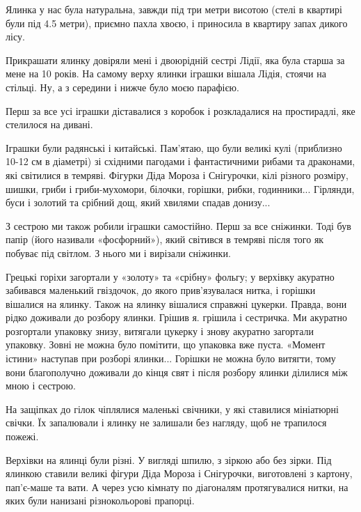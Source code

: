 Ялинка у нас була натуральна, завжди під три метри висотою (стелі в квартирі
були під 4.5 метри), приємно пахла хвоєю, і приносила в квартиру запах дикого
лісу. 

Прикрашати ялинку довіряли мені і двоюрідній сестрі Лідії, яка була старша за
мене на 10 років. На самому верху ялинки іграшки вішала Лідія, стоячи на
стільці. Ну, а з середини і нижче було моєю парафією.


Перш за все усі іграшки діставалися з коробок і розкладалися на простирадлі,
яке стелилося на дивані. 

Іграшки були радянські і китайські. Пам’ятаю, що були великі кулі (приблизно
10-12 см в діаметрі) зі східними пагодами і фантастичними рибами та драконами,
які світилися в темряві. Фігурки Діда Мороза і Снігурочки, кілі різного
розміру, шишки, гриби і гриби-мухомори, білочки, горішки, рибки, годинники...
Гірлянди, буси і золотий та срібний дощ, який хвилями спадав донизу... 

З сестрою ми також робили іграшки самостійно. Перш за все сніжинки. Тоді був
папір (його називали «фосфорний»), який світився в темряві після того як
побуває під світлом. З нього ми і вирізали сніжинки. 

Грецькі горіхи загортали у «золоту» та «срібну» фольгу; у верхівку акуратно
забивався маленький гвіздочок, до якого прив’язувалася нитка, і горішки
вішалися на ялинку. Також на ялинку вішалися справжні цукерки. Правда, вони
рідко доживали до розбору ялинки. Грішив я. грішила і сестричка. Ми акуратно
розгортали упаковку знизу, витягали цукерку і знову акуратно загортали
упаковку. Зовні не можна було помітити, що упаковка вже пуста. «Момент істини»
наступав при розборі ялинки... Горішки не можна було витягти, тому вони
благополучно доживали до кінця свят і після розбору ялинки ділилися між мною і
сестрою.


На защіпках до гілок чіплялися маленькі свічники, у які ставилися мініатюрні
свічки. Їх запалювали і ялинку не залишали без нагляду, щоб не трапилося
пожежі.


Верхівки на ялинці були різні. У вигляді шпилю, з зіркою або без зірки. Під
ялинкою ставили великі фігури Діда Мороза і Снігурочки, виготовлені з картону,
пап’є-маше та вати. А через усю кімнату по діагоналям протягувалися нитки, на
яких були нанизані різнокольорові прапорці.

